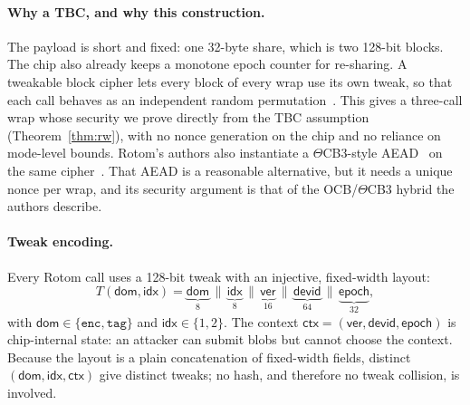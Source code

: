 \documentclass[11pt]{article}
\theoremstyle{remark}
\begin{document}
\paragraph{Why a TBC, and why this construction.} The payload is short and fixed: one 32-byte share, which is two 128-bit blocks. The chip also already keeps a monotone epoch counter for re-sharing. A tweakable block cipher lets every block of every wrap use its own tweak, so that each call behaves as an independent random permutation~\cite{lrw02}. This gives a three-call wrap whose security we prove directly from the TBC assumption (Theorem~\ref{thm:rw}), with no nonce generation on the chip and no reliance on mode-level bounds. Rotom's authors also instantiate a $\Theta$CB3-style AEAD~\cite{kr11} on the same cipher~\cite[App.~D]{rotom26}. That AEAD is a reasonable alternative, but it needs a unique nonce per wrap, and its security argument is that of the OCB/$\Theta$CB3 hybrid the authors describe.

\paragraph{Tweak encoding.} Every Rotom call uses a 128-bit tweak with an injective, fixed-width layout:
\[
T(\mathsf{dom}, \mathsf{idx}) = \underbrace{\mathsf{dom}}_{8} \,\|\, \underbrace{\mathsf{idx}}_{8} \,\|\, \underbrace{\mathsf{ver}}_{16} \,\|\, \underbrace{\mathsf{devid}}_{64} \,\|\, \underbrace{\mathsf{epoch}}_{32},
\]
with $\mathsf{dom} \in \{\mathtt{enc}, \mathtt{tag}\}$ and $\mathsf{idx} \in \{1,2\}$. The context $\mathsf{ctx} = (\mathsf{ver}, \mathsf{devid}, \mathsf{epoch})$ is chip-internal state: an attacker can submit blobs but cannot choose the context. Because the layout is a plain concatenation of fixed-width fields, distinct $(\mathsf{dom}, \mathsf{idx}, \mathsf{ctx})$ give distinct tweaks; no hash, and therefore no tweak collision, is involved.
\end{document}
